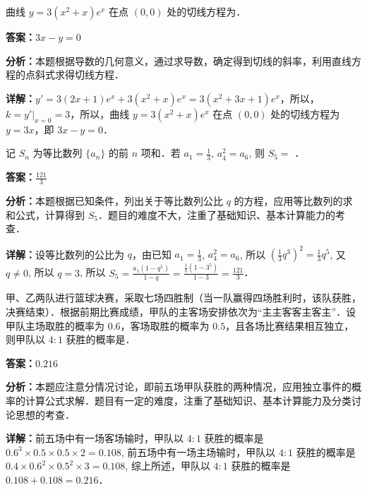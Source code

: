 \begin{question}[points=5]
曲线 $y = 3(x^2 + x)e^x$ 在点 $(0, 0)$ 处的切线方程为．
\fillin[{$3x - y = 0$}]
\begin{solution}
\textbf{答案：}$3x - y = 0$

\textbf{分析：}本题根据导数的几何意义，通过求导数，确定得到切线的斜率，利用直线方程的点斜式求得切线方程．

\textbf{详解：}$y' = 3(2x + 1)e^x + 3(x^2 + x)e^x = 3(x^2 + 3x + 1)e^x$，所以，$k = y'|_{x=0} = 3$，所以，曲线 $y = 3(x^2 + x)e^x$ 在点 $(0, 0)$ 处的切线方程为 $y = 3x$，即 $3x - y = 0$．
\end{solution}
\end{question}

\begin{question}[points=5]
记 $S_n$ 为等比数列 $\{a_n\}$ 的前 $n$ 项和．若 $a_1 = \frac{1}{3}$, $a_4^2 = a_6$, 则 $S_5 =$ ．
\fillin[{$\frac{121}{3}$}]
\begin{solution}
\textbf{答案：}$\frac{121}{3}$

\textbf{分析：}本题根据已知条件，列出关于等比数列公比 $q$ 的方程，应用等比数列的求和公式，计算得到 $S_5$．题目的难度不大，注重了基础知识、基本计算能力的考查．

\textbf{详解：}设等比数列的公比为 $q$，由已知 $a_1 = \frac{1}{3}$, $a_4^2 = a_6$, 所以 $\left(\frac{1}{3}q^3\right)^2 = \frac{1}{3}q^5$, 又 $q \neq 0$, 所以 $q = 3$, 所以 $S_5 = \frac{a_1(1 - q^5)}{1 - q} = \frac{\frac{1}{3}(1 - 3^5)}{1 - 3} = \frac{121}{3}$．
\end{solution}
\end{question}

\begin{question}[points=5]
甲、乙两队进行篮球决赛，采取七场四胜制（当一队赢得四场胜利时，该队获胜，决赛结束）．根据前期比赛成绩，甲队的主客场安排依次为“主主客客主客主”．设甲队主场取胜的概率为 $0.6$，客场取胜的概率为 $0.5$，且各场比赛结果相互独立，则甲队以 $4 \colon 1$ 获胜的概率是．
\fillin[{$0.216$}]
\begin{solution}
\textbf{答案：}$0.216$

\textbf{分析：}本题应注意分情况讨论，即前五场甲队获胜的两种情况，应用独立事件的概率的计算公式求解．题目有一定的难度，注重了基础知识、基本计算能力及分类讨论思想的考查．

\textbf{详解：}前五场中有一场客场输时，甲队以 $4 \colon 1$ 获胜的概率是 $0.6^3 \times 0.5 \times 0.5 \times 2 = 0.108$, 前五场中有一场主场输时，甲队以 $4 \colon 1$ 获胜的概率是 $0.4 \times 0.6^2 \times 0.5^2 \times 3 = 0.108$, 综上所述，甲队以 $4 \colon 1$ 获胜的概率是 $0.108 + 0.108 = 0.216$．
\end{solution}
\end{question}

